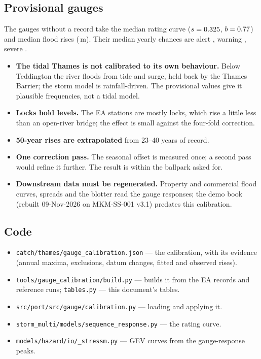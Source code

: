 \documentclass[11pt,a4paper]{article}
\begin{document}
\subsection{Provisional gauges}\label{sec:provisional}
The \gcNProv{} gauges without a record take the median rating curve ($s=0.325$,
$b=0.77$) and median flood rises (\gcDefaultRises\,m). Their median yearly chances are
alert \gcProvAlert, warning \gcProvWarning, severe \gcProvSevere.

\mkmlimitations
\begin{itemize}
    \item \textbf{The tidal Thames is not calibrated to its own behaviour.} Below Teddington the
          river floods from tide and surge, held back by the Thames Barrier; the storm model is
          rainfall-driven. The provisional values give it plausible frequencies, not a
          tidal model.
    \item \textbf{Locks hold levels.} The EA stations are mostly locks, which rise a little less
          than an open-river bridge; the effect is small against the four-fold correction.
    \item \textbf{50-year rises are extrapolated} from 23--40 years of record.
    \item \textbf{One correction pass.} The seasonal offset is measured once; a second pass
          would refine it further. The result is within the ballpark asked for.
    \item \textbf{Downstream data must be regenerated.} Property and commercial flood curves,
          spreads and the blotter read the gauge responses; the demo book (rebuilt
          09-Nov-2026 on MKM-SS-001 v3.1) predates this calibration.
\end{itemize}

\mkmimplementation

\subsection{Code}
\begin{itemize}[nosep]
    \item \texttt{catch/thames/gauge\_calibration.json} --- the calibration, with its evidence
          (annual maxima, exclusions, datum changes, fitted and observed rises).
    \item \texttt{tools/gauge\_calibration/build.py} --- builds it from the EA records and
          reference runs; \texttt{tables.py} --- this document's tables.
    \item \texttt{src/port/src/gauge/calibration.py} --- loading and applying it.
    \item \texttt{storm\_multi/models/sequence\_response.py} --- the rating curve.
    \item \texttt{models/hazard/io/\_stressm.py} --- GEV curves from the gauge-response peaks.
\end{itemize}
\end{document}
